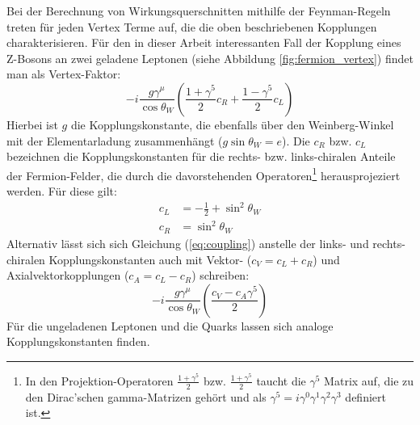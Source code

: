 Bei der Berechnung von Wirkungsquerschnitten mithilfe der Feynman-Regeln treten
für jeden Vertex Terme auf, die die oben beschriebenen Kopplungen
charakterisieren. Für den in dieser Arbeit interessanten Fall der Kopplung
eines Z-Bosons an zwei geladene Leptonen (siehe Abbildung
\ref{fig:fermion_vertex}) findet man als Vertex-Faktor:
\begin{equation}
    -i \frac{g\gamma^\mu}{\cos\theta_W} \left( \frac{1+\gamma^5}{2} c_R
        + \frac{1-\gamma^5}{2} c_L \right)
    \label{eq:coupling}
\end{equation}
Hierbei ist $g$ die Kopplungskonstante, die ebenfalls über den Weinberg-Winkel
mit der Elementarladung zusammenhängt ($g\sin\theta_W=e$). Die $c_R$ bzw.
$c_L$ bezeichnen die Kopplungskonstanten für die rechts- bzw. links-chiralen
Anteile der Fermion-Felder, die durch die davorstehenden Operatoren\footnote{In
den Projektion-Operatoren $\frac{1+\gamma^5}{2}$ bzw. $\frac{1+\gamma^5}{2}$
taucht die $\gamma^5$ Matrix auf, die zu den Dirac'schen gamma-Matrizen gehört
und als $\gamma^5=i\gamma^0\gamma^1\gamma^2\gamma^3$ definiert ist.}
herausprojeziert werden. Für diese gilt:
\begin{align}
    c_L &= - \frac{1}{2} + \sin^2\theta_W   \\
    c_R &= \sin^2\theta_W
\end{align}
Alternativ lässt sich sich Gleichung (\ref{eq:coupling}) anstelle der links-
und rechts-chiralen Kopplungskonstanten auch mit Vektor- ($c_V=c_L+c_R$) und
Axialvektorkopplungen ($c_A=c_L-c_R$) schreiben:
\begin{equation}
    -i \frac{g\gamma^\mu}{\cos\theta_W} \left( \frac{c_V-c_A\gamma^5}{2}\right)
\end{equation}
Für die ungeladenen Leptonen und die Quarks lassen sich analoge
Kopplungskonstanten finden.

